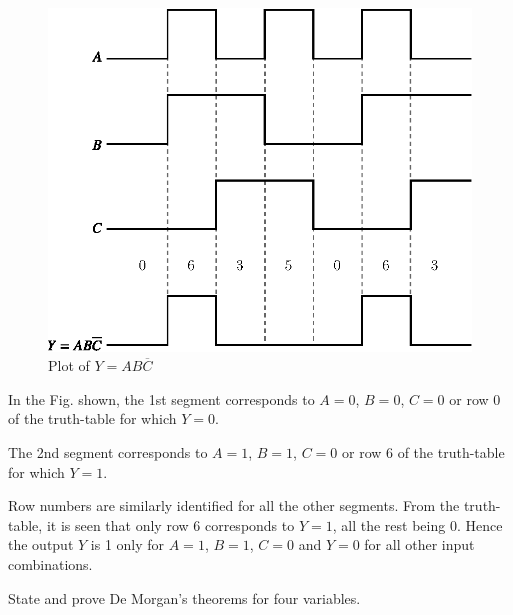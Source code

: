 \begin{solution}
\begin{figure}[H]
\includegraphics{chap6/fig126.eps}
\caption*{Plot of $Y=AB\overline{C}$}
\end{figure}

In the Fig. shown, the 1st segment corresponds to $A=0$, $B=0$, $C=0$ or row $0$ of the truth-table for which $Y=0$.

The 2nd segment corresponds to $A=1$, $B=1$, $C=0$ or row $6$ of the truth-table for which $Y=1$.

Row numbers are similarly identified for all the other segments. From the truth-table, it is seen that only row 6 corresponds to $Y=1$, all the rest being $0$. Hence the output $Y$ is 1 only for $A=1$, $B=1$, $C=0$ and $Y=0$ for all other input combinations.
\end{solution}

\begin{example}\label{exam6.35}
State and prove De Morgan's theorems for four variables.
\end{example}

